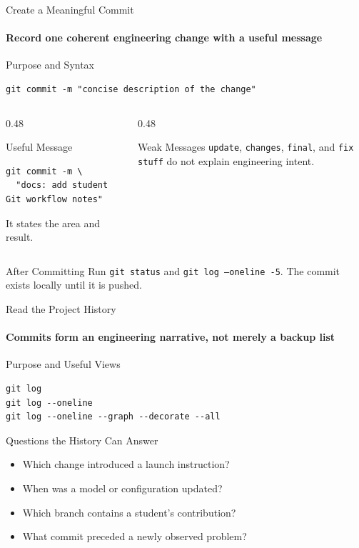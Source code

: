 \begin{frame}[fragile]{Create a Meaningful Commit}
\framesubtitle{Record one coherent engineering change with a useful message}
\footnotesize
\begin{block}{Purpose and Syntax}
\begin{verbatim}
git commit -m "concise description of the change"
\end{verbatim}
\end{block}
\begin{columns}[T,onlytextwidth]
\begin{column}{0.48\textwidth}
\begin{exampleblock}{Useful Message}
\begin{verbatim}
git commit -m \
  "docs: add student Git workflow notes"
\end{verbatim}
It states the area and result.
\end{exampleblock}
\end{column}
\begin{column}{0.48\textwidth}
\begin{alertblock}{Weak Messages}
\texttt{update}, \texttt{changes}, \texttt{final}, and \texttt{fix stuff} do not explain engineering intent.
\end{alertblock}
\end{column}
\end{columns}
\begin{block}{After Committing}
Run \texttt{git status} and \texttt{git log --oneline -5}. The commit exists locally until it is pushed.
\end{block}
\end{frame}

\begin{frame}[fragile]{Read the Project History}
\framesubtitle{Commits form an engineering narrative, not merely a backup list}
\footnotesize
\begin{block}{Purpose and Useful Views}
\begin{verbatim}
git log
git log --oneline
git log --oneline --graph --decorate --all
\end{verbatim}
\end{block}
\begin{exampleblock}{Questions the History Can Answer}
\begin{itemize}\setlength{\itemsep}{0.18em}
\item Which change introduced a launch instruction?
\item When was a model or configuration updated?
\item Which branch contains a student's contribution?
\item What commit preceded a newly observed problem?
\end{itemize}
\end{exampleblock}
\end{frame}

